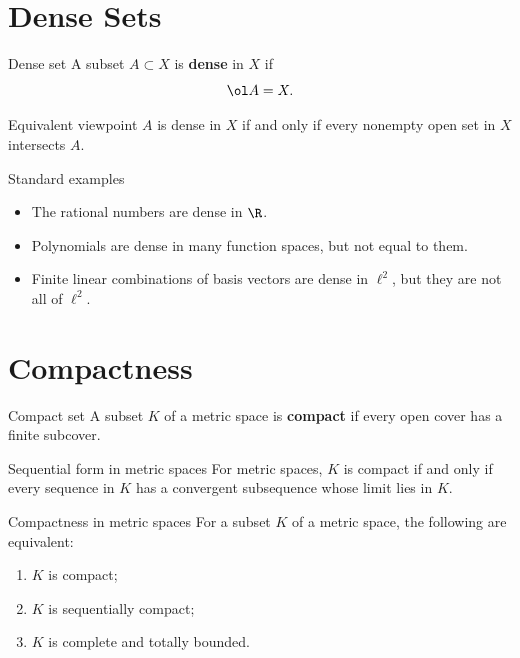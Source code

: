 \documentclass[header={Ancillary Note: Basic Topology},notheorems]{study-note}
\begin{document}
\section{Dense Sets}

\begin{defbox}{Dense set}
A subset $A\subset X$ is \textbf{dense} in $X$ if
\[
\ol A=X.
\]
\end{defbox}

\begin{thmbox}{Equivalent viewpoint}
$A$ is dense in $X$ if and only if every nonempty open set in $X$ intersects $A$.
\end{thmbox}

\begin{exbox}{Standard examples}
\begin{itemize}
\item The rational numbers are dense in $\R$.
\item Polynomials are dense in many function spaces, but not equal to them.
\item Finite linear combinations of basis vectors are dense in $\ell^2$, but they are not all of $\ell^2$.
\end{itemize}
\end{exbox}

\section{Compactness}

\begin{defbox}{Compact set}
A subset $K$ of a metric space is \textbf{compact} if every open cover has a finite subcover.
\end{defbox}

\begin{thmbox}{Sequential form in metric spaces}
For metric spaces, $K$ is compact if and only if every sequence in $K$ has a convergent subsequence whose limit lies in $K$.
\end{thmbox}

\begin{thmbox}{Compactness in metric spaces}
For a subset $K$ of a metric space, the following are equivalent:
\begin{enumerate}
\item $K$ is compact;
\item $K$ is sequentially compact;
\item $K$ is complete and totally bounded.
\end{enumerate}
\end{thmbox}
\end{document}
